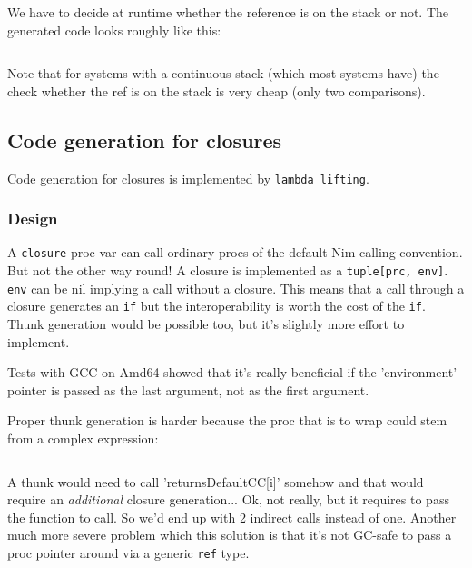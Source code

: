 We have to decide at runtime whether the reference is on the stack or
not. The generated code looks roughly like this:

\begin{verbatim}
\end{verbatim}

Note that for systems with a continuous stack (which most systems have)
the check whether the ref is on the stack is very cheap (only two
comparisons).

\hypertarget{code-generation-for-closures}{%
\subsection{Code generation for
closures}\label{code-generation-for-closures}}

Code generation for closures is implemented by \texttt{lambda\ lifting}.

\hypertarget{design}{%
\subsubsection{Design}\label{design}}

A \texttt{closure} proc var can call ordinary procs of the default Nim
calling convention. But not the other way round! A closure is
implemented as a \texttt{tuple{[}prc,\ env{]}}. \texttt{env} can be nil
implying a call without a closure. This means that a call through a
closure generates an \texttt{if} but the interoperability is worth the
cost of the \texttt{if}. Thunk generation would be possible too, but
it's slightly more effort to implement.

Tests with GCC on Amd64 showed that it's really beneficial if the
'environment' pointer is passed as the last argument, not as the first
argument.

Proper thunk generation is harder because the proc that is to wrap could
stem from a complex expression:

\begin{verbatim}
\end{verbatim}

A thunk would need to call 'returnsDefaultCC{[}i{]}' somehow and that
would require an \emph{additional} closure generation... Ok, not really,
but it requires to pass the function to call. So we'd end up with 2
indirect calls instead of one. Another much more severe problem which
this solution is that it's not GC-safe to pass a proc pointer around via
a generic \texttt{ref} type.


